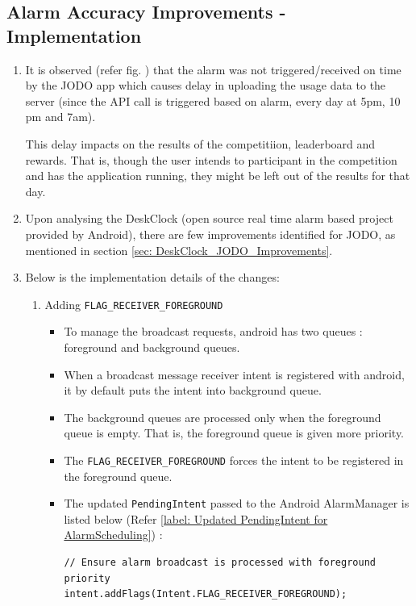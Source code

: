 \documentclass{article}
\begin{document}
\subsection{Alarm Accuracy Improvements - Implementation}
\begin{enumerate}
    \item It is observed (refer fig. ) that the alarm was not triggered/received on time by the JODO app which causes delay in uploading the usage data to the server (since the API call is triggered based on alarm, every day at 5pm, 10 pm and 7am).
    
    This delay impacts on the results of the competitiion, leaderboard and rewards. 
    That is, though the user intends to participant in the competition and has the application running, they might be left out of the results for that day.
    \item Upon analysing the DeskClock (open source real time alarm based project provided by Android), there are few improvements identified for JODO, as mentioned in section \ref{sec: DeskClock_JODO_Improvements}.
    \item Below is the implementation details of the changes:
    \begin{enumerate}
        \item Adding \texttt{FLAG\_RECEIVER\_FOREGROUND}
        \begin{itemize}
            \item To manage the broadcast requests, android has two queues : foreground and background queues. 
            \item When a broadcast message receiver intent is registered with android, it by default puts the intent into background queue.
            \item The background queues are processed only when the foreground queue is empty. That is, the foreground queue is given more priority.
            \item The \texttt{FLAG\_RECEIVER\_FOREGROUND} forces the intent to be registered in the foreground queue.
            \item The updated \texttt{PendingIntent} passed to the Android AlarmManager is listed below (Refer \ref{label: Updated PendingIntent for AlarmScheduling}) : 
\begin{lstlisting}[caption={Updated PendingIntent for AlarmScheduling},label={label: Updated PendingIntent for AlarmScheduling}]
// Ensure alarm broadcast is processed with foreground priority
intent.addFlags(Intent.FLAG_RECEIVER_FOREGROUND);


\end{lstlisting}
\end{itemize}
\end{enumerate}
\end{enumerate}
\end{document}
